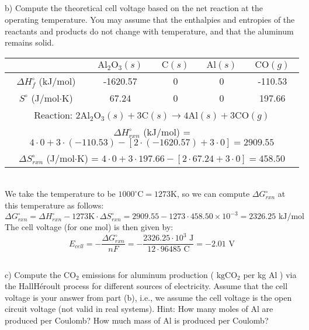 \documentclass[12pt]{article}
\begin{document}
\subsection{}
b) Compute the theoretical cell voltage based on the net reaction at the operating temperature. You may assume that the enthalpies and entropies of the reactants and products do not change with temperature, and that the aluminum remains solid.\\
\begin{center}
\begin{tabular}{|c|c|c|c|c|}
\hline
 & $\mathrm{Al_{2}O_{3}}(s)$ & $\mathrm{C}(s)$ & $\mathrm{Al}(s)$ & $\mathrm{CO}(g)$ \\
\hline
$\Delta H_{f}^{\circ}$ (kJ/mol) & -1620.57 & 0 & 0 & -110.53 \\
\hline
$S^{\circ}$ (J/mol$\cdot$K) & 67.24 & 0 & 0 & 197.66 \\
\hline
\multicolumn{5}{|c|}{Reaction: $2 \mathrm{Al}_{2} \mathrm{O}_{3}(s)+3 \mathrm{C}(s) \rightarrow 4 \mathrm{Al}(s)+3 \mathrm{CO}(g)$} \\
\hline
\multicolumn{5}{|c|}{$\Delta H_{rxn}^{\circ}$ (kJ/mol) = $4 \cdot 0 + 3 \cdot (-110.53) - [2 \cdot (-1620.57) + 3 \cdot 0] =2909.55 $} \\
\hline
\multicolumn{5}{|c|}{$\Delta S_{rxn}^{\circ}$ (J/mol$\cdot$K) = $4 \cdot 0 + 3 \cdot 197.66 - [2 \cdot 67.24 + 3 \cdot 0] = 458.50$} \\
\hline
\end{tabular}\\
We take the temperature to be $1000^{\circ} \mathrm{C}=1273 \mathrm{K}$, so we can compute $\Delta G_{rxn}^{\circ}$ at this temperature as follows:
\begin{equation}
\Delta G_{rxn}^{\circ} = \Delta H_{rxn}^{\circ} - 1273 \mathrm{K} \cdot \Delta S_{rxn}^{\circ} = 2909.55 - 1273 \cdot 458.50 \times 10^{-3} = 2326.25 \text{ kJ/mol}
\end{equation}
The cell voltage (for one mol) is then given by:
\begin{equation}E_{cell} = -\frac{\Delta G_{rxn}^{\circ}}{nF} = -\frac{2326.25 \cdot 10^{3} \text{ J}}{12 \cdot 96485 \text{ C}} = -2.01 \text{ V}
\end{equation}

\end{center}
\subsection{}
c) Compute the $\mathrm{CO}_{2}$ emissions for aluminum production ( $\mathrm{kg} \mathrm{CO}_{2}$ per kg Al ) via the HallHéroult process for different sources of electricity. Assume that the cell voltage is your answer from part (b), i.e., we assume the cell voltage is the open circuit voltage (not valid in real systems). Hint: How many moles of Al are produced per Coulomb? How much mass of Al is produced per Coulomb?\\
\end{document}

